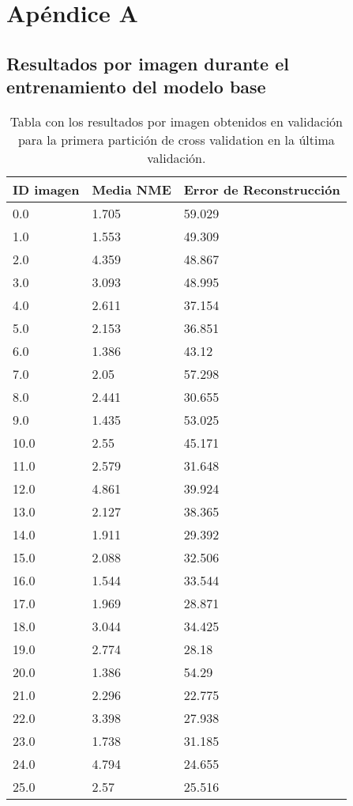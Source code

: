 
\chapter{Apéndice A}\label{ap:apendiceA}

\section{Resultados por imagen durante el entrenamiento del modelo base}

\begin{table}[!ht]
    \centering
    \caption{Tabla con los resultados por imagen obtenidos en validación para la primera partición de cross validation en la última validación.}
    \begin{tabular}{|l|l|l|}
    \hline
        ID imagen & Media NME & Error de Reconstrucción \\ \hline 
        0.0 & 1.705 & 59.029 \\ \hline
        1.0 & 1.553 & 49.309 \\ \hline
        2.0 & 4.359 & 48.867 \\ \hline
        3.0 & 3.093 & 48.995 \\ \hline
        4.0 & 2.611 & 37.154 \\ \hline
        5.0 & 2.153 & 36.851 \\ \hline
        6.0 & 1.386 & 43.12 \\ \hline
        7.0 & 2.05 & 57.298 \\ \hline
        8.0 & 2.441 & 30.655 \\ \hline
        9.0 & 1.435 & 53.025 \\ \hline
        10.0 & 2.55 & 45.171 \\ \hline
        11.0 & 2.579 & 31.648 \\ \hline
        12.0 & 4.861 & 39.924 \\ \hline
        13.0 & 2.127 & 38.365 \\ \hline
        14.0 & 1.911 & 29.392 \\ \hline
        15.0 & 2.088 & 32.506 \\ \hline
        16.0 & 1.544 & 33.544 \\ \hline
        17.0 & 1.969 & 28.871 \\ \hline
        18.0 & 3.044 & 34.425 \\ \hline
        19.0 & 2.774 & 28.18 \\ \hline
        20.0 & 1.386 & 54.29 \\ \hline
        21.0 & 2.296 & 22.775 \\ \hline
        22.0 & 3.398 & 27.938 \\ \hline
        23.0 & 1.738 & 31.185 \\ \hline
        24.0 & 4.794 & 24.655 \\ \hline
        25.0 & 2.57 & 25.516 \\ \hline
    \end{tabular}
    \label{table:ModelBase_Partition1}
\end{table}

